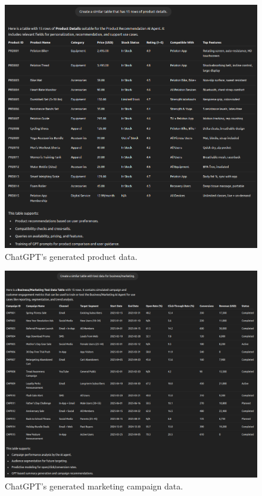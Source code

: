 \documentclass[11pt,letterpaper]{article}
\begin{document}
  \begin{figure}[h!]
    \centering
      \includegraphics[width=1.0\linewidth]{chatgpt_07.png}    
      \caption{ChatGPT's generated product data.}
    \label{fig:products}
\end{figure}

\begin{figure}[h!]
    \centering
      \includegraphics[width=1.0\linewidth]{chatgpt_08.png}    
      \caption{ChatGPT's generated marketing campaign data.}
    \label{fig:marketing}
\end{figure}
\end{document}
